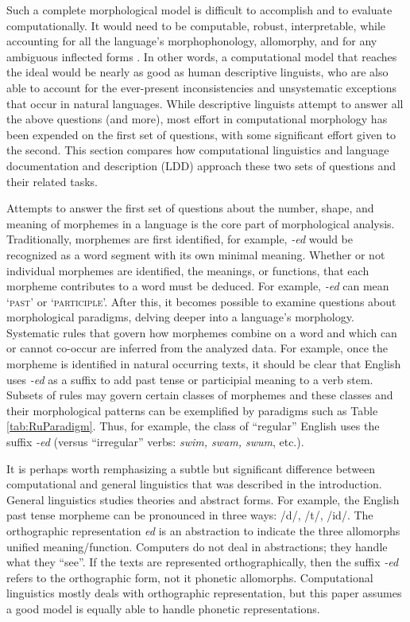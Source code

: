 \documentclass[12pt]{article}
\begin{document}
Such a complete morphological model is difficult to accomplish and to evaluate computationally. It would need to be computable, robust, interpretable, while accounting for all the language's morphophonology, allomorphy, and for any ambiguous inflected forms \cite{virpioja_empirical_2011}. In other words, a computational model that reaches the ideal would be nearly as good as human descriptive linguists, who are also able to account for the ever-present inconsistencies and unsystematic exceptions that occur in natural languages. While descriptive linguists attempt to answer all the above questions (and more), most effort in computational morphology has been expended on the first set of questions, with some significant effort given to the second. This section compares how computational linguistics and language documentation and description (LDD) approach these two sets of questions and their related tasks.

Attempts to answer the first set of questions about the number, shape, and meaning of morphemes in a language is the core part of morphological analysis. Traditionally, morphemes are first identified, for example, \textit{-ed} would be recognized as a word segment with its own minimal meaning. Whether or not individual morphemes are identified, the meanings, or functions, that each morpheme contributes to a word must be deduced. For example, \textit{-ed} can mean `\textsc{past}' or `\textsc{participle}'. After this, it becomes possible to examine questions about morphological paradigms, delving deeper into a language's morphology. Systematic rules that govern how morphemes combine on a word and which can or cannot co-occur are inferred from the analyzed data. For example, once the morpheme is identified in natural occurring texts, it should be clear that English uses \textit{-ed} as a suffix to add past tense or participial meaning to a verb stem. Subsets of rules may govern certain classes of morphemes and these classes and their morphological patterns can be exemplified by paradigms such as Table \ref{tab:RuParadigm}. Thus, for example, the class of ``regular'' English uses the suffix \textit{-ed} (versus ``irregular'' verbs: \textit{swim, swam, swum}, etc.).

It is perhaps worth remphasizing a subtle but significant difference between computational and general linguistics that was described in the introduction. General linguistics studies theories and abstract forms. For example, the English past tense morpheme can be pronounced in three ways: /d/, /t/, /id/. The orthographic representation \textit{ed} is an abstraction to indicate the three allomorphs unified meaning/function. Computers do not deal in abstractions; they handle what they ``see''. If the texts are represented orthographically, then the suffix \textit{-ed} refers to the orthographic form, not it phonetic allomorphs. Computational linguistics mostly deals with orthographic representation, but this paper assumes a good model is equally able to handle phonetic representations.
\end{document}
